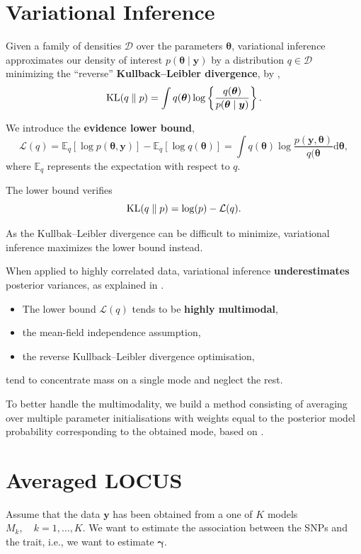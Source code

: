 \documentclass[portrait, a0, 30pt]{sciposter}
\DeclareMathOperator*{\KL}{{\rm KL}}
\begin{document}
\begin{multicols*}{2}
\section{Variational Inference}
Given a family of densities $\mathcal{D}$ over the parameters $\boldsymbol{\theta}$, variational inference approximates our density of interest $p(\boldsymbol{\theta}\mid\boldsymbol{y})$ by a distribution $q \in \mathcal{D}$ minimizing the ``reverse'' \textbf{Kullback--Leibler divergence}, by \citet{kl51},
\begin{equation*}
\KL (q \parallel p) = \int q(\boldsymbol{\theta}) \log \left\lbrace\frac{q(\boldsymbol{\theta})}{p(\boldsymbol{\theta}\mid\boldsymbol{y})}\right\rbrace.
\end{equation*}

We introduce the \textbf{evidence lower bound},
\[
\mathcal{L}(q)=\mathbb{E}_q\left[\log p(\boldsymbol{\theta},\boldsymbol{y})\right]-\mathbb{E}_q\left[\log q(\boldsymbol{\theta})\right] = \int q(\boldsymbol{\theta})\log\frac{p(\boldsymbol{y},\boldsymbol{\theta})}{q(\boldsymbol{\theta}}\mathrm{d}\boldsymbol{\theta},
\]
where $\mathbb{E}_q$ represents the expectation with respect to $q$.

The lower bound verifies
\[
\KL(q\parallel p) = \log(p)-\mathcal{L}(q).
\]

As the Kullbak--Leibler divergence can be difficult to minimize, variational inference maximizes the lower bound instead.

\begin{shaded}
When applied to highly correlated data, variational inference \textbf{underestimates} posterior variances, as explained in \citet{varInf}. \begin{itemize}
\item The lower bound $\mathcal{L}(q)$ tends to be \textbf{highly multimodal},
\item the mean-field independence assumption,
\item the reverse Kullback--Leibler divergence optimisation,
\end{itemize}
tend to concentrate mass on a single mode and neglect the rest.

To better handle the multimodality, we build a method consisting of averaging over multiple parameter initialisations with weights equal to the posterior model probability corresponding to the obtained mode, based on \citet{eff_inf}.
\end{shaded}
\section{Averaged LOCUS}
Assume that the data $\boldsymbol{y}$ has been obtained from a one of $K$ models $M_k,\quad k=1,\dots,K$. We want to estimate the association between the SNPs and the trait, i.e., we want to estimate $\boldsymbol{\gamma}$.


\end{multicols*}
\end{document}
